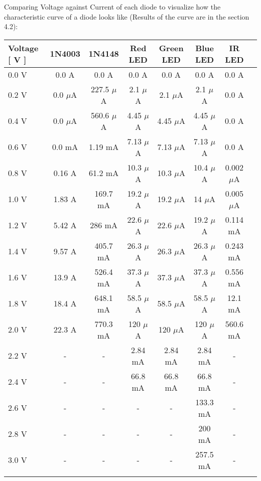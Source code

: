 \documentclass[10pt,a4paper]{article}
\begin{document}
Comparing Voltage against Current of each diode to visualize how the characteristic curve of a diode looks like (Results of the curve are in the section 4.2): 

\begin{center}
\begin{tabular}[.5cm]{l c c c c c c c }
\toprule
Voltage [ V ] & 1N4003 & 1N4148 & Red LED & Green LED & Blue LED & IR LED \\
\midrule
0.0 V & 0.0 A & 0.0 A & 0.0 A & 0.0 A & 0.0 A & 0.0 A \\
\cmidrule{1-7}
0.2 V & 0.0 $\mu$A & 227.5 $\mu$A & 2.1 $\mu$A & 2.1 $\mu$A & 2.1 $\mu$A & 0.0 A \\
\cmidrule{1-7}
0.4 V & 0.0 $\mu$A & 560.6 $\mu$A & 4.45 $\mu$A & 4.45 $\mu$A & 4.45 $\mu$A & 0.0 A \\
\cmidrule{1-7}
0.6 V & 0.0 mA & 1.19 mA & 7.13 $\mu$A & 7.13 $\mu$A & 7.13 $\mu$A & 0.0 A \\
\cmidrule{1-7}
0.8 V & 0.16 A & 61.2 mA & 10.3 $\mu$A & 10.3 $\mu$A & 10.4 $\mu$A & 0.002 $\mu$A \\
\cmidrule{1-7}
1.0 V & 1.83 A & 169.7 mA & 19.2 $\mu$A & 19.2 $\mu$A & 14 $\mu$A & 0.005 $\mu$A \\
\cmidrule{1-7}
1.2 V & 5.42 A & 286 mA & 22.6 $\mu$A & 22.6 $\mu$A & 19.2 $\mu$A & 0.114 mA \\
\cmidrule{1-7}
1.4 V & 9.57 A & 405.7 mA & 26.3 $\mu$A & 26.3 $\mu$A & 26.3 $\mu$A & 0.243 mA \\
\cmidrule{1-7}
1.6 V & 13.9 A & 526.4 mA & 37.3 $\mu$A & 37.3 $\mu$A & 37.3 $\mu$A & 0.556 mA \\
\cmidrule{1-7}
1.8 V & 18.4 A & 648.1 mA & 58.5 $\mu$A & 58.5 $\mu$A & 58.5 $\mu$A & 12.1 mA \\
\cmidrule{1-7}
2.0 V & 22.3 A & 770.3 mA & 120 $\mu$A & 120 $\mu$A & 120 $\mu$A & 560.6 mA \\
\cmidrule{1-7}
2.2 V & - & - & 2.84 mA & 2.84 mA & 2.84 mA & - \\
\cmidrule{1-7}
2.4 V & - & - & 66.8 mA & 66.8 mA & 66.8 mA & - \\
\cmidrule{1-7}
2.6 V & - & - & - & - & 133.3 mA & - \\
\cmidrule{1-7}
2.8 V & - & - & - & - & 200 mA & - \\
\cmidrule{1-7}
3.0 V & - & - & - & - & 257.5 mA & - \\
\bottomrule
\linebreak
\end{tabular}
\end{center} 
\end{document}
